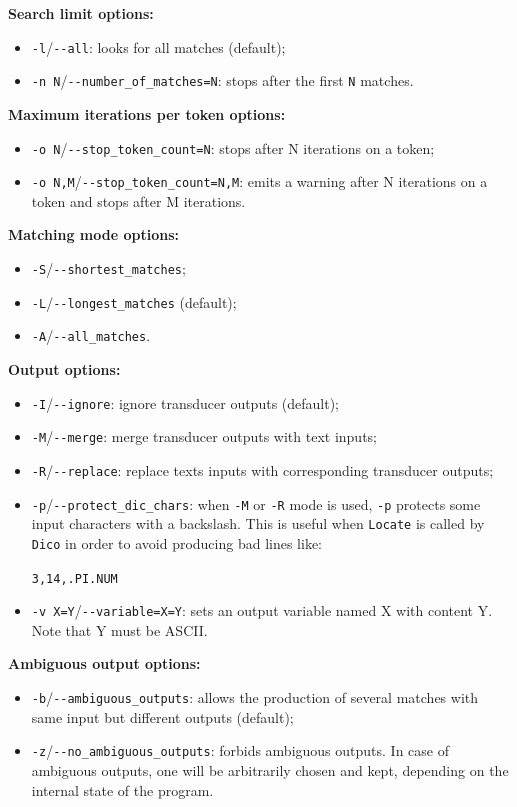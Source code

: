 \bigskip
\noindent \textbf{Search limit options:}
\begin{itemize}
  \item \verb+-l+/\verb+--all+: looks for all matches (default);
  \item \verb+-n N+/\verb+--number_of_matches=N+: stops after the first
  \verb+N+ matches.
\end{itemize}

\bigskip
\noindent \textbf{Maximum iterations per token options:}
\begin{itemize}
  \item \verb+-o N+/\verb+--stop_token_count=N+: stops after N iterations on a token;
  \item \verb+-o N,M+/\verb+--stop_token_count=N,M+: emits a warning after N iterations on a token and stops after M iterations.
\end{itemize}

\bigskip
\noindent \textbf{Matching mode options:}
\begin{itemize}
  \item \verb+-S+/\verb+--shortest_matches+;
  \item \verb+-L+/\verb+--longest_matches+ (default);
  \item \verb+-A+/\verb+--all_matches+.
\end{itemize}

\bigskip
\noindent \textbf{Output options:}
\begin{itemize}
  \item \verb+-I+/\verb+--ignore+: ignore transducer outputs (default);
  \item \verb+-M+/\verb+--merge+: merge transducer outputs with text inputs;
  \item \verb+-R+/\verb+--replace+: replace texts inputs with corresponding
  transducer outputs;
  \item \verb+-p+/\verb+--protect_dic_chars+: when \verb+-M+ or \verb+-R+ mode is
  used, \verb+-p+ protects some input characters with a backslash. This is useful
  when \verb+Locate+ is called by \verb+Dico+ in order to avoid producing bad
  lines like:
  
  \verb+3,14,.PI.NUM+
  \item \verb+-v X=Y+/\verb+--variable=X=Y+: sets an output variable named X with content Y. 
  Note that Y must be ASCII.
\end{itemize}

\bigskip
\noindent \textbf{Ambiguous output options:}
\begin{itemize}
  \item \verb+-b+/\verb+--ambiguous_outputs+: allows the production of several 
  matches with same input but different outputs (default);
  \item \verb+-z+/\verb+--no_ambiguous_outputs+: forbids ambiguous outputs. In
  case of ambiguous outputs, one will be arbitrarily chosen and kept, depending on the
  internal state of the program.
\end{itemize}


